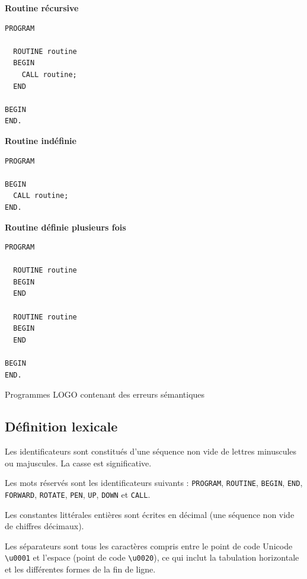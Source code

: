 \begin{table}[t]
  \centering
  \small

\begin{multicols}{3}

\textbf{Routine récursive}

\begin{lstlisting}
PROGRAM

  ROUTINE routine
  BEGIN
    CALL routine;
  END
  
BEGIN
END.
\end{lstlisting}

\columnbreak

\textbf{Routine indéfinie}

\begin{lstlisting}
PROGRAM

BEGIN
  CALL routine;
END.
\end{lstlisting}

\columnbreak
\textbf{Routine définie plusieurs fois}

\begin{lstlisting}
PROGRAM

  ROUTINE routine
  BEGIN
  END
  
  ROUTINE routine
  BEGIN
  END
  
BEGIN
END.
\end{lstlisting}

\end{multicols}

  \caption{Programmes LOGO contenant des erreurs sémantiques}
  \ligne
\end{table}

\subsection{Définition lexicale}

Les identificateurs sont constitués d'une séquence non vide de lettres minuscules ou majuscules. La casse est significative.

Les mots réservés sont les identificateurs suivants : \texttt{PROGRAM}, \texttt{ROUTINE}, \texttt{BEGIN}, \texttt{END}, \texttt{FORWARD}, \texttt{ROTATE}, \texttt{PEN}, \texttt{UP}, \texttt{DOWN} et \texttt{CALL}.

Les constantes littérales entières sont écrites en décimal (une séquence non vide de chiffres décimaux).

Les séparateurs sont tous les caractères compris entre le point de code Unicode \texttt{\textquotesingle\textbackslash u0001\textquotesingle} et l’espace (point de code \texttt{\textquotesingle\textbackslash u0020\textquotesingle}), ce qui inclut la tabulation horizontale et les différentes formes de la fin de ligne.

